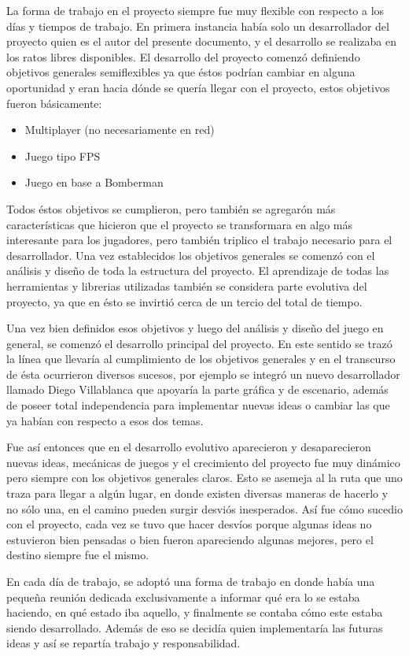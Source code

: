 \documentclass[a4paper,12pt,openany,oneside]{book}
\begin{document}
La forma de trabajo en el proyecto siempre fue muy flexible con respecto a los días y tiempos de trabajo. En primera instancia había solo un desarrollador del proyecto quien es el autor del presente documento, y el desarrollo se realizaba en los ratos libres disponibles.
El desarrollo del proyecto comenzó definiendo objetivos generales semiflexibles ya que éstos podrían cambiar en alguna oportunidad y eran hacia dónde se quería llegar con el proyecto, estos objetivos fueron básicamente:
\begin{itemize}
\item Multiplayer (no necesariamente en red)
\item Juego tipo FPS
\item Juego en base a Bomberman
\end{itemize}
Todos éstos objetivos se cumplieron, pero también se agregarón más características que hicieron que el proyecto se transformara en algo más interesante para los jugadores, pero también triplico el trabajo necesario para el desarrollador. Una vez establecidos los objetivos generales se comenzó con el análisis y diseño de toda la estructura del proyecto. El aprendizaje de todas las herramientas y librerias utilizadas también se considera parte evolutiva del proyecto, ya que en ésto se invirtió cerca de un tercio del total de tiempo.

Una vez bien definidos esos objetivos y luego del análisis y diseño del juego en general, se comenzó el desarrollo principal del proyecto. En este sentido se trazó la línea que llevaría al cumplimiento de los objetivos generales y en el transcurso de ésta ocurrieron diversos sucesos, por ejemplo se integró un nuevo desarrollador llamado Diego Villablanca que apoyaría la parte gráfica y de escenario, además de poseer total independencia para implementar nuevas ideas o cambiar las que ya habían con respecto a esos dos temas.

Fue así entonces que en el desarrollo evolutivo aparecieron y desaparecieron nuevas ideas, mecánicas de juegos y el crecimiento del proyecto fue muy dinámico pero siempre con los objetivos generales claros. Esto se asemeja al la ruta que uno traza para llegar a algún lugar, en donde existen diversas maneras de hacerlo y no sólo una, en el camino pueden surgir desviós inesperados. Así fue cómo sucedio con el proyecto, cada vez se tuvo que hacer desvíos porque algunas ideas no estuvieron bien pensadas o bien fueron apareciendo algunas mejores, pero el destino siempre fue el mismo.

En cada día de trabajo, se adoptó una forma de trabajo en donde había una pequeña reunión dedicada exclusivamente a informar qué era lo se estaba haciendo, en qué estado iba aquello, y finalmente se contaba cómo este estaba siendo desarrollado. Además de eso se decidía quien implementaría las futuras ideas y así se repartía trabajo y responsabilidad.
\end{document}
